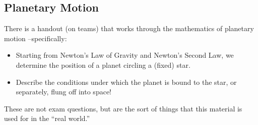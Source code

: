 \subsection{Planetary Motion}

There is a handout (on teams) that works through the mathematics of planetary motion --specifically:
\begin{itemize}
    \item Starting from Newton's Law of Gravity and Newton's Second Law, we determine the position of a planet circling a (fixed) star.
    \item Describe the conditions under which the planet is bound to the star, or separately, flung off into space!
\end{itemize}
These are not exam questions, but are the sort of things that this material is used for in the ``real world.'' \\